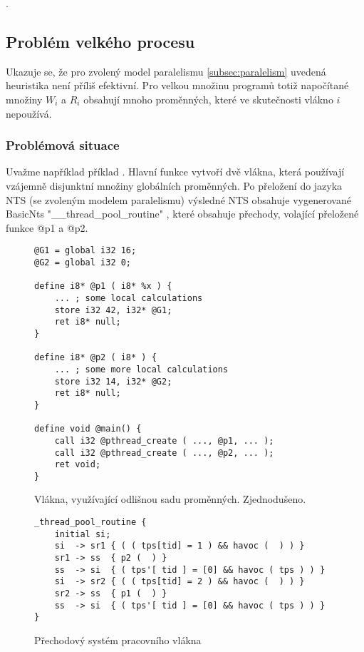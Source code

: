 \documentclass[10pt,a4paper,notitlepage]{report}
\begin{document}
.

\subsection{Problém velkého procesu}
Ukazuje se, že pro zvolený model paralelismu \ref{subsec:paralelism} uvedená heuristika není příliš efektivní. Pro velkou množinu programů  totiž napočítané množiny $W_i$ a $R_i$ obsahují mnoho proměnných, které ve skutečnosti vlákno $i$ nepoužívá.


\subsubsection{Problémová situace}
Uvažme například příklad . Hlavní funkce vytvoří dvě vlákna, která používají vzájemně disjunktní množiny globálních proměnných. Po přeložení do jazyka NTS (se zvoleným modelem paralelismu) výsledné NTS obsahuje vygenerované BasicNts "__thread_pool_routine" , které obsahuje přechody, volající přeložené funkce @p1 a @p2.
\begin{figure}[h!]
\begin{lstlisting}
@G1 = global i32 16;
@G2 = global i32 0;

define i8* @p1 ( i8* %x ) {
	... ; some local calculations
	store i32 42, i32* @G1;
	ret i8* null;
}

define i8* @p2 ( i8* ) {
	... ; some more local calculations
	store i32 14, i32* @G2;
	ret i8* null;
}

define void @main() {
	call i32 @pthread_create ( ..., @p1, ... );
	call i32 @pthread_create ( ..., @p2, ... );
	ret void;
}
\end{lstlisting}
\caption{Vlákna, využívající odlišnou sadu proměnných. Zjednodušeno.}
\end{figure}

\begin{figure}
\begin{lstlisting}
_thread_pool_routine {
	initial	si;
	si  -> sr1 { ( ( tps[tid] = 1 ) && havoc (  ) ) }
	sr1 -> ss  { p2 (  ) }
	ss  -> si  { ( tps'[ tid ] = [0] && havoc ( tps ) ) }
	si  -> sr2 { ( ( tps[tid] = 2 ) && havoc (  ) ) }
	sr2 -> ss  { p1 (  ) }
	ss  -> si  { ( tps'[ tid ] = [0] && havoc ( tps ) ) }
}
\end{lstlisting}
\caption{Přechodový systém pracovního vlákna}
\end{figure}
\end{document}
